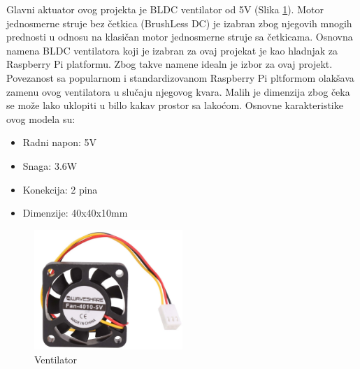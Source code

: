 \documentclass[a4paper, 12pt]{article}
\begin{document}
	\vspace{10pt}
	
\begingroup
	
	Glavni aktuator ovog projekta je BLDC ventilator od 5V (Slika \ref{fig:DC40mm5V}). Motor jednosmerne struje bez četkica (BrushLess DC) je izabran zbog njegovih mnogih prednosti u odnosu na klasičan motor jednosmerne struje sa četkicama. Osnovna namena BLDC ventilatora koji je izabran za ovaj projekat je kao hladnjak za Raspberry Pi platformu. Zbog takve namene idealn je izbor za ovaj projekt. Povezanost sa popularnom i standardizovanom Raspberry Pi pltformom olakšava zamenu ovog ventilatora u slučaju njegovog kvara.  Malih je dimenzija zbog čeka se može lako uklopiti u billo kakav prostor sa lakoćom. Osnovne karakteristike ovog modela su: 
	

\begin{itemize}
	\item Radni napon: 5V
	\item Snaga: 3.6W
	\item Konekcija: 2 pina
	\item Dimenzije: 40x40x10mm
\end{itemize}

\begin{figure}
\centering
\includegraphics[width=0.5\textwidth]{images/DC40mm5V} 
\caption{Ventilator} \label{fig:DC40mm5V}
\end{figure}
\end{document}
